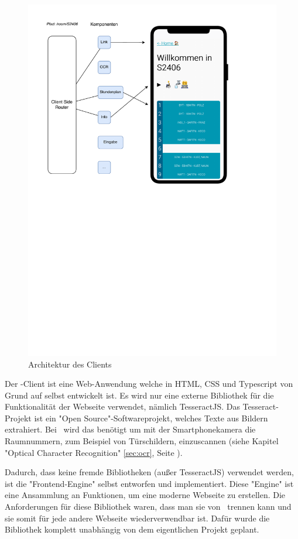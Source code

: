 
\begin{figure}[H]
    \centering
    \includegraphics[width=120mm]{media/Intro/client_arch.svg.pdf}
    \caption{Architektur des Clients}
\end{figure}

Der \ZELIA-Client ist eine Web-Anwendung welche in HTML, CSS und Typescript von Grund auf selbst entwickelt ist. Es wird nur eine externe Bibliothek für die Funktionalität der Webseite verwendet, nämlich TesseractJS. Das Tesseract-Projekt ist ein "Open Source"-Softwareprojekt, welches Texte aus Bildern extrahiert. Bei \ZELIA\ wird das benötigt um mit der Smartphonekamera die Raumnummern, zum Beispiel von Türschildern, einzuscannen (siehe Kapitel "Optical Character Recognition" \ref{sec:ocr}, Seite \pageref{sec:ocr}).

Dadurch, dass keine fremde Bibliotheken (außer TesseractJS) verwendet werden, ist die "Frontend-Engine" selbst entworfen und implementiert. Diese "Engine" ist eine Ansammlung an Funktionen, um eine moderne Webseite zu erstellen. Die Anforderungen für diese Bibliothek waren, dass man sie von \ZELIA\ trennen kann und sie somit für jede andere Webseite wiederverwendbar ist. Dafür wurde die Bibliothek komplett unabhängig von dem eigentlichen Projekt geplant. 

